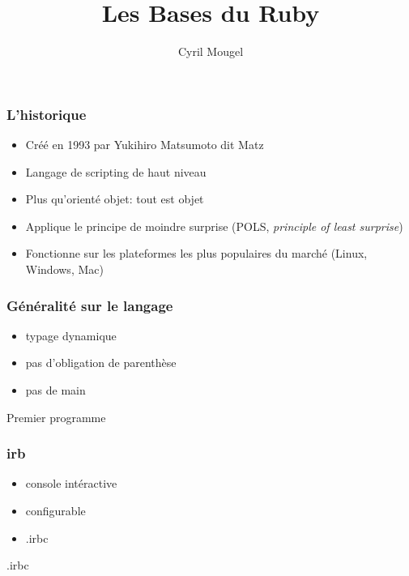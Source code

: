 \documentclass{beamer}
\title{Les Bases du Ruby}
\author{Cyril Mougel}
\begin{document}
\begin{frame}
  \titlepage
\end{frame}

\Large{}

\begin{frame}
	\frametitle{L'historique}
	\begin{itemize}
		\item Créé en 1993 par Yukihiro Matsumoto dit \og{}Matz\fg{}
		\item Langage de scripting de haut niveau
		\item Plus qu'orienté objet: tout est objet
        \item Applique le principe de moindre surprise (POLS, \emph{principle of
                least surprise})
        \item Fonctionne sur les plateformes les plus populaires du marché (Linux, Windows,
                Mac)
	\end{itemize}
\end{frame}

\begin{frame}
  \frametitle{G\'en\'eralit\'e sur le langage}
  \begin{itemize}
    \item typage dynamique
    \item pas d'obligation de parenthèse
    \item pas de main
  \end{itemize}
\end{frame}

\begin{frame}
  \begin{beamerboxesrounded}{Premier programme}
    
  \end{beamerboxesrounded}
\end{frame}

\begin{frame}
  \frametitle{irb}
  \begin{itemize}
    \item console intéractive
    \item configurable
    \item .irbc
  \end{itemize}
\end{frame}

\begin{frame}
  \begin{beamerboxesrounded}{.irbc}
    
  \end{beamerboxesrounded}
\end{frame}
\end{document}
